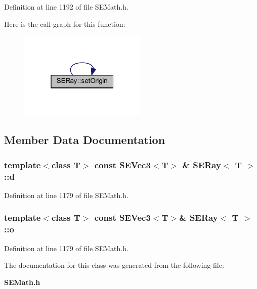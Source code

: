 Definition at line 1192 of file S\+E\+Math.\+h.



Here is the call graph for this function\+:
\nopagebreak
\begin{figure}[H]
\begin{center}
\leavevmode
\includegraphics[width=172pt]{class_s_e_ray_ad0a356b34280121af4ac70ea1130642a_cgraph}
\end{center}
\end{figure}




\subsection{Member Data Documentation}
\subsubsection[{d}]{\setlength{\rightskip}{0pt plus 5cm}template$<$class T$>$ const {\bf S\+E\+Vec3}$<$T$>$ \& {\bf S\+E\+Ray}$<$ T $>$\+::d}\label{class_s_e_ray_a9a2402fe7f6ec7baba23b64245f45fe6}


Definition at line 1179 of file S\+E\+Math.\+h.

\subsubsection[{o}]{\setlength{\rightskip}{0pt plus 5cm}template$<$class T$>$ const {\bf S\+E\+Vec3}$<$T$>$\& {\bf S\+E\+Ray}$<$ T $>$\+::o}\label{class_s_e_ray_aa9bba8a99bf3df13670fad12075f9d2f}


Definition at line 1179 of file S\+E\+Math.\+h.



The documentation for this class was generated from the following file\+:\begin{DoxyCompactItemize}
\item 
{\bf S\+E\+Math.\+h}\end{DoxyCompactItemize}
